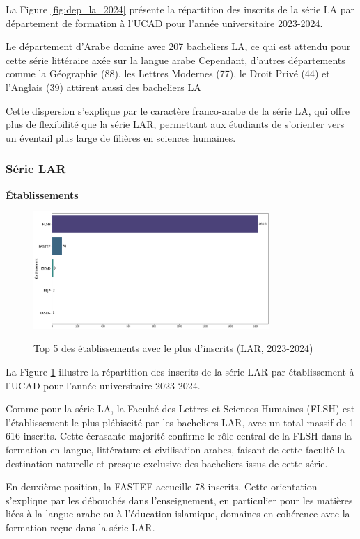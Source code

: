 La Figure \ref{fig:dep_la_2024} présente la répartition des inscrits de la série LA par département de formation à l'UCAD pour l'année universitaire 2023-2024.

Le département d'Arabe domine avec 207 bacheliers LA, ce qui est attendu pour cette série littéraire axée sur la langue arabe
Cependant, d’autres départements comme la Géographie (88), les Lettres Modernes (77), le Droit Privé (44) et l’Anglais (39) attirent aussi des bacheliers LA

Cette dispersion s’explique par le caractère franco-arabe de la série LA, qui offre plus de flexibilité que la série LAR, permettant aux étudiants de s’orienter vers un éventail plus large de filières en sciences humaines.
\subsubsection{Série LAR}

\textbf{Établissements}

\begin{figure}[ht]
\centering
\caption{Top 5 des établissements avec le plus d'inscrits (LAR, 2023-2024)}
\includegraphics[width=0.8\textwidth]{figure/etab_LAR_2024.png}
\label{fig:etab_lar_2024}
\end{figure}

La Figure \ref{fig:etab_lar_2024} illustre la répartition des inscrits de la série LAR par établissement à l'UCAD pour l'année universitaire 2023-2024.

Comme pour la série LA, la Faculté des Lettres et Sciences Humaines (FLSH) est l’établissement le plus plébiscité par les bacheliers LAR, avec un total massif de 1 616 inscrits. 
Cette écrasante majorité confirme le rôle central de la FLSH dans la formation en langue, littérature et civilisation arabes, faisant de cette faculté la destination naturelle et presque exclusive des bacheliers issus de cette série.

En deuxième position, la FASTEF accueille 78 inscrits. Cette orientation s'explique par les débouchés dans l’enseignement, en particulier pour les matières liées à la langue arabe ou à l’éducation islamique, domaines en cohérence avec la formation reçue dans la série LAR.

